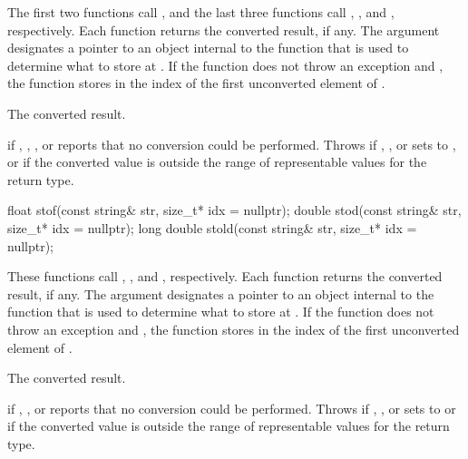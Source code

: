 \begin{itemdescr}
\pnum
\effects
The first two functions call ,
and the last three functions call ,
, and , respectively. Each function returns the converted result, if any. The
argument  designates a pointer to an object internal to the function
that is used to determine what to store at . If the function does
not throw an exception and , the function stores in 
the index of the first unconverted element of .

\pnum
\returns
The converted result.

\pnum
\throws
{} if , ,
, or  reports that no conversion could be
performed. Throws  if , ,
 or  sets  to ,
or if the converted value is outside the range of representable values
for the return type.
\end{itemdescr}

%
%
%
\begin{itemdecl}
float stof(const string& str, size_t* idx = nullptr);
double stod(const string& str, size_t* idx = nullptr);
long double stold(const string& str, size_t* idx = nullptr);
\end{itemdecl}

\begin{itemdescr}
\pnum
\effects
These functions call
, , and
, respectively. Each function returns
the converted result, if any. The argument  designates a pointer to
an object internal to the function that is used to determine what to store at
. If the function does not throw an exception and ,
the function stores in  the index of the first unconverted element
of .

\pnum
\returns
The converted result.

\pnum
\throws
{} if , , or
 reports that no conversion could be performed. Throws
 if , , or
 sets  to 
or if the converted value is outside the range of representable
values for the return type.
\end{itemdescr}

